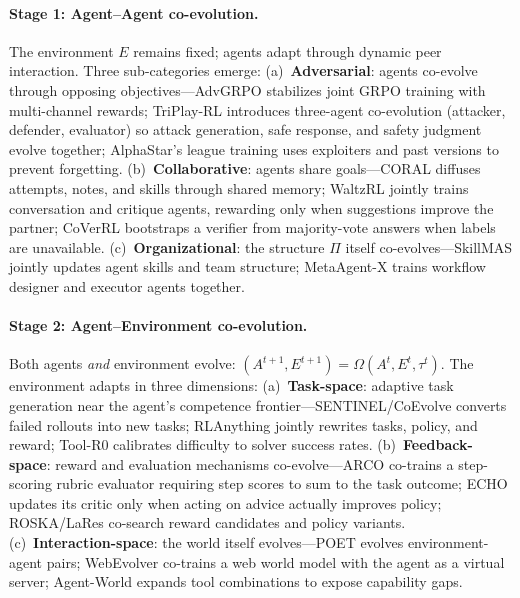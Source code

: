\documentclass[11pt,a4paper]{article}
\begin{document}
\paragraph{Stage 1: Agent--Agent co-evolution.} The environment $E$ remains fixed; agents adapt through dynamic peer interaction. Three sub-categories emerge: (a)~\textbf{Adversarial}: agents co-evolve through opposing objectives---AdvGRPO stabilizes joint GRPO training with multi-channel rewards; TriPlay-RL introduces three-agent co-evolution (attacker, defender, evaluator) so attack generation, safe response, and safety judgment evolve together; AlphaStar's league training uses exploiters and past versions to prevent forgetting. (b)~\textbf{Collaborative}: agents share goals---CORAL diffuses attempts, notes, and skills through shared memory; WaltzRL jointly trains conversation and critique agents, rewarding only when suggestions improve the partner; CoVerRL bootstraps a verifier from majority-vote answers when labels are unavailable. (c)~\textbf{Organizational}: the structure $\Pi$ itself co-evolves---SkillMAS jointly updates agent skills and team structure; MetaAgent-X trains workflow designer and executor agents together.

\paragraph{Stage 2: Agent--Environment co-evolution.} Both agents \emph{and} environment evolve: $(A^{t+1}, E^{t+1}) = \Omega(A^t, E^t, \tau^t)$. The environment adapts in three dimensions: (a)~\textbf{Task-space}: adaptive task generation near the agent's competence frontier---SENTINEL/CoEvolve converts failed rollouts into new tasks; RLAnything jointly rewrites tasks, policy, and reward; Tool-R0 calibrates difficulty to solver success rates. (b)~\textbf{Feedback-space}: reward and evaluation mechanisms co-evolve---ARCO co-trains a step-scoring rubric evaluator requiring step scores to sum to the task outcome; ECHO updates its critic only when acting on advice actually improves policy; ROSKA/LaRes co-search reward candidates and policy variants. (c)~\textbf{Interaction-space}: the world itself evolves---POET evolves environment-agent pairs; WebEvolver co-trains a web world model with the agent as a virtual server; Agent-World expands tool combinations to expose capability gaps.
\end{document}

